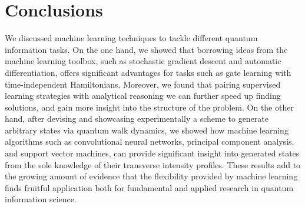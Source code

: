 \documentclass[12pt,twoside]{report}
\begin{document}


% 

% 

% 

% 

% 

\chapter{Conclusions}

We discussed machine learning techniques to tackle different quantum information tasks.
On the one hand, we showed that borrowing ideas from the machine learning toolbox, such as stochastic gradient descent and automatic differentiation, offers significant advantages for tasks such as gate learning with time-independent Hamiltonians.
Moreover, we found that pairing supervised learning strategies with analytical reasoning we can further speed up finding solutions, and gain more insight into the structure of the problem.
On the other hand, after devising and showcasing experimentally a scheme to generate arbitrary states via quantum walk dynamics, we showed how machine learning algorithms such as convolutional neural networks, principal component analysis, and support vector machines, can provide significant insight into generated states from the sole knowledge of their transverse intensity profiles.
These results add to the growing amount of evidence that the flexibility provided by machine learning finds fruitful application both for fundamental and applied research in quantum information science.



\end{document}
